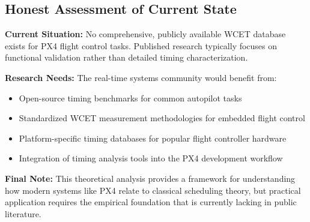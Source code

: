 \documentclass[12pt,a4paper]{article}
\begin{document}
\subsection{Honest Assessment of Current State}

\textbf{Current Situation:} No comprehensive, publicly available WCET database exists for PX4 flight control tasks. Published research typically focuses on functional validation rather than detailed timing characterization.

\textbf{Research Needs:} The real-time systems community would benefit from:
\begin{itemize}
\item Open-source timing benchmarks for common autopilot tasks
\item Standardized WCET measurement methodologies for embedded flight control
\item Platform-specific timing databases for popular flight controller hardware
\item Integration of timing analysis tools into the PX4 development workflow
\end{itemize}

\textbf{Final Note:} This theoretical analysis provides a framework for understanding how modern systems like PX4 relate to classical scheduling theory, but practical application requires the empirical foundation that is currently lacking in public literature.
\end{document}
